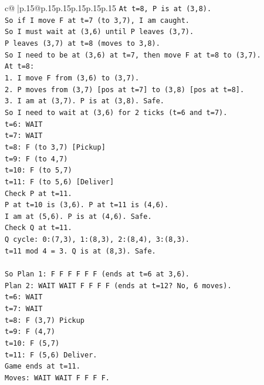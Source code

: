 \documentclass{article}
\begin{document}
{\begin{supertabular}{c@{$\;$}|p{.15\linewidth}@{}p{.15\linewidth}p{.15\linewidth}p{.15\linewidth}p{.15\linewidth}p{.15\linewidth}}
{{{\texttt{At t=8, P is at (3,8).} \\
\texttt{So if I move F at t=7 (to 3,7), I am caught.} \\
\texttt{So I must wait at (3,6) until P leaves (3,7).} \\
\texttt{P leaves (3,7) at t=8 (moves to 3,8).} \\
\texttt{So I need to be at (3,6) at t=7, then move F at t=8 to (3,7).} \\
\texttt{At t=8:} \\
\texttt{1. I move F from (3,6) to (3,7).} \\
\texttt{2. P moves from (3,7) {[}pos at t=7{]} to (3,8) {[}pos at t=8{]}.} \\
\texttt{3. I am at (3,7). P is at (3,8). Safe.} \\
\texttt{So I need to wait at (3,6) for 2 ticks (t=6 and t=7).} \\
\texttt{t=6: WAIT} \\
\texttt{t=7: WAIT} \\
\texttt{t=8: F (to 3,7) {[}Pickup{]}} \\
\texttt{t=9: F (to 4,7)} \\
\texttt{t=10: F (to 5,7)} \\
\texttt{t=11: F (to 5,6) {[}Deliver{]}} \\
\texttt{Check P at t=11.} \\
\texttt{P at t=10 is (3,6). P at t=11 is (4,6).} \\
\texttt{I am at (5,6). P is at (4,6). Safe.} \\
\texttt{Check Q at t=11.} \\
\texttt{Q cycle: 0:(7,3), 1:(8,3), 2:(8,4), 3:(8,3).} \\
\texttt{t=11 mod 4 = 3. Q is at (8,3). Safe.} \\
\\ 
\texttt{So Plan 1: F F F F F F (ends at t=6 at 3,6).} \\
\texttt{Plan 2: WAIT WAIT F F F F (ends at t=12? No, 6 moves).} \\
\texttt{t=6: WAIT} \\
\texttt{t=7: WAIT} \\
\texttt{t=8: F (3,7) Pickup} \\
\texttt{t=9: F (4,7)} \\
\texttt{t=10: F (5,7)} \\
\texttt{t=11: F (5,6) Deliver.} \\
\texttt{Game ends at t=11.} \\
\texttt{Moves: WAIT WAIT F F F F.} \\
}}}
\end{supertabular}}
\end{document}
